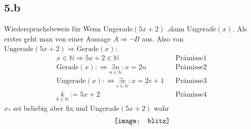 \documentclass[10pt,ngerman]{scrartcl}
\begin{document}
\subsection{5.b}
Wiederspruchsbeweis für \glqq Wenn Ungerade$(5x+2)$ ,dann Ungerade$(x)$\grqq{}. Als erstes geht man von einer Aussage $A \Rightarrow \neg B$ aus. Also von $\text{Ungerade}(5x + 2) \Rightarrow \text{Gerade}(x)$:
\setcounter{equation}{0}
\begin{align}
x  \in \mathbb{N} \Rightarrow 5x +2 \in \mathbb{N} && \text{Prämisse} 1 \\
\text{Gerade}(x) : \Leftrightarrow \underset{n \in \mathbb{N}}{\exists n}: x = 2n && \text{Prämisse}2\\
\text{Ungerade}(x) : \Leftrightarrow \underset{e \in \mathbb{N}}{\exists e}: x = 2e +1 && \text{Prämisse}3\\
\underset{k \in \mathbb{N}}{k} := 5x + 2 && \text{Prämisse}4
\end{align}
$x_*$ sei beliebig aber fix und Ungerade$(5x+2)$ wahr\\
\begin{align}
[\text{Gerade}(x_*):\Leftrightarrow \exists n : x_* = 2n && \text{ in Prämisse } 2 \text{ einsetzten}\\
k = 5(2n) +2 = 10 n +2 && x_*\text{ in Prämisse } 4 \text{ einsetzten}\\
\text{Ungerade}(x_*) : \Leftrightarrow \underset{e \in \mathbb{N}}{\exists e}: x_* = 2e +1 && \text{ in Prämisse } 3 \text{ einsetzten}\\
k = 5(2e +1) +2 = 10e +7 && x_*\text{ in Prämisse } 4 \text{ einsetzten}\\
10 e + 7 = 10 n + 2  && k \text{ von Zeile } 6 \text{ und } 8 \text{ gleich setzten}\\
10e+5 = 10n\\
\underbrace{\frac{10 e + 5}{10} = n}_{ e \in \mathbb{N}; n \in \mathbb{N}; \frac{10e +5}{10} \notin \mathbb{N}}] && \qquad \vcenter{\hbox{\texttt{[image: blitz]}}}
\end{align}
\end{document}
